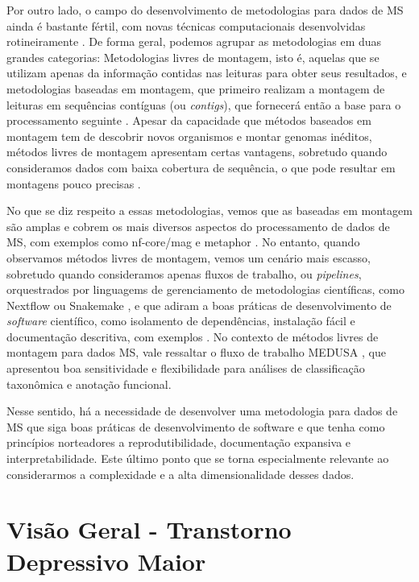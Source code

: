 \documentclass[
	12pt,				%
	oneside,			%
	a4paper,			%
	chapter=TITLE,		%
	section=TITLE,		%
	english,			%
	brazil				%
	]{abntex2}
\begin{document}
Por outro lado, o campo do desenvolvimento de metodologias para dados de \gls{MS} ainda é bastante fértil, com novas técnicas computacionais desenvolvidas rotineiramente \autocite{liu2021}. De forma geral, podemos agrupar as metodologias em duas grandes categorias: Metodologias livres de montagem, isto é, aquelas que se utilizam apenas da informação contidas nas leituras para obter seus resultados, e metodologias baseadas em montagem, que primeiro realizam a montagem de leituras em sequências contíguas (ou \textit{contigs}), que fornecerá então a base para o processamento seguinte \autocite{breitwieser2019}. Apesar da capacidade que métodos baseados em montagem tem de descobrir novos organismos e montar genomas inéditos, métodos livres de montagem apresentam certas vantagens, sobretudo quando consideramos dados com baixa cobertura de sequência, o que pode resultar em montagens pouco precisas \autocite{ayling2020}.

No que se diz respeito a essas metodologias, vemos que as baseadas em montagem são amplas e cobrem os mais diversos aspectos do processamento de dados de \gls{MS}, com exemplos como nf-core/mag \autocite{krakau2022} e metaphor \autocite{salazar2023}. No entanto, quando observamos métodos livres de montagem, vemos um cenário mais escasso, sobretudo quando consideramos apenas fluxos de trabalho, ou \emph{pipelines}, orquestrados por linguagems de gerenciamento de metodologias científicas, como Nextflow \autocite{ditommaso2017} ou Snakemake \autocite{mölder2021}, e que adiram a boas práticas de desenvolvimento de \emph{software} científico, como isolamento de dependências, instalação fácil e documentação descritiva, com exemplos \autocite{mangul2019}. No contexto de métodos livres de montagem para dados \gls{MS}, vale ressaltar o fluxo de trabalho MEDUSA \autocite{morais2022}, que apresentou boa sensitividade e flexibilidade para análises de classificação taxonômica e anotação funcional.

Nesse sentido, há a necessidade de desenvolver uma metodologia para dados de \gls{MS} que siga boas práticas de desenvolvimento de software e que tenha como princípios norteadores a reprodutibilidade, documentação expansiva e interpretabilidade. Este último ponto que se torna especialmente relevante ao considerarmos a complexidade e a alta dimensionalidade desses dados.

\section{Visão Geral - Transtorno Depressivo Maior}\label{visuxe3o-geral---transtorno-depressivo-maior}
\end{document}
